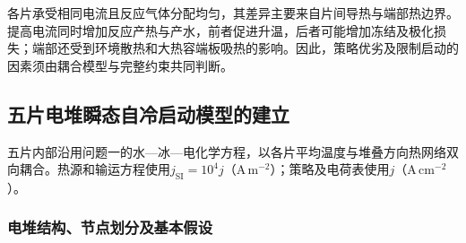 \documentclass[bwprint]{gmcmthesis}
\numberwithin{equation}{section}
\numberwithin{figure}{section}
\begin{document}
各片承受相同电流且反应气体分配均匀，其差异主要来自片间导热与端部热边界。提高电流同时增加反应产热与产水，前者促进升温，后者可能增加冻结及极化损失；端部还受到环境散热和大热容端板吸热的影响。因此，策略优劣及限制启动的因素须由耦合模型与完整约束共同判断。
\subsection{五片电堆瞬态自冷启动模型的建立}
五片内部沿用问题一的水—冰—电化学方程，以各片平均温度与堆叠方向热网络双向耦合。热源和输运方程使用$j_{\mathrm{SI}}=10^4j$（$\mathrm{A\,m^{-2}}$）；策略及电荷表使用$j$（$\mathrm{A\,cm^{-2}}$）。

\subsubsection{电堆结构、节点划分及基本假设}
\end{document}
